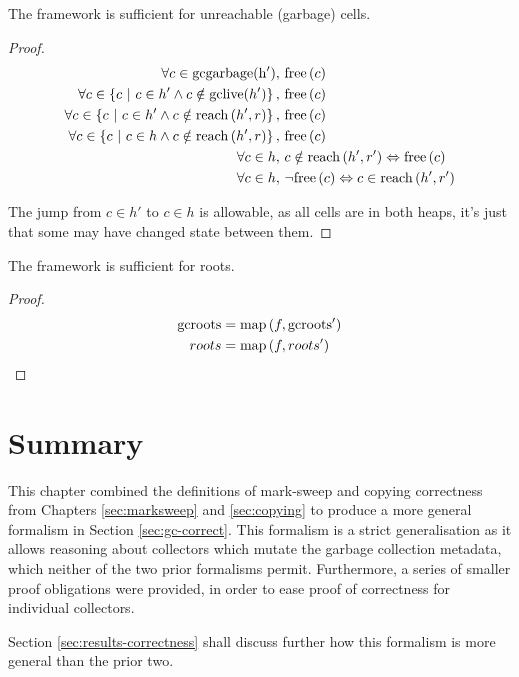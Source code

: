 \begin{lemma}
  The framework is sufficient for unreachable (garbage) cells.
\end{lemma}

\begin{proof}
  \begin{align*}
    \forall c \in \mathrm{gcgarbage(h')},\ & \mathrm{free}\left(c\right)\\
    \forall c \in \left\{c~|~c \in h' \land c \notin
      \mathrm{gclive}(h')\right\},\ & \mathrm{free}\left(c\right)\\
    \forall c \in \left\{c~|~c \in h' \land c \notin
      \mathrm{reach}\left(h', r\right)\right\},\ & \mathrm{free}\left(c\right)\\
    \forall c \in \left\{c~|~c \in h \land c \notin
      \mathrm{reach}\left(h', r\right)\right\},\ & \mathrm{free}\left(c\right)\\
    \forall c \in h,\ & c \notin \mathrm{reach}\left(h', r'\right) \Leftrightarrow \mathrm{free}\left(c\right)\\
    \forall c \in h,\ & \lnot\mathrm{free}\left(c\right) \Leftrightarrow c \in \mathrm{reach}\left(h', r'\right)
  \end{align*}

  The jump from $c \in h'$ to $c \in h$ is allowable, as all cells are
  in both heaps, it's just that some may have changed state between
  them.
\end{proof}

\begin{lemma}[Roots]
  The framework is sufficient for roots.
\end{lemma}

\begin{proof}
  \begin{align*}
    \mathrm{gcroots} &= \mathrm{map}\left(f, \mathrm{gcroots'}\right)\\
    roots &= \mathrm{map}\left(f, roots'\right)
  \end{align*}
\end{proof}

\section{Summary}
\label{sec:gc-summary}

This chapter combined the definitions of mark-sweep and copying
correctness from Chapters \ref{sec:marksweep} and \ref{sec:copying} to
produce a more general formalism in Section \ref{sec:gc-correct}. This
formalism is a strict generalisation as it allows reasoning about
collectors which mutate the garbage collection metadata, which neither
of the two prior formalisms permit. Furthermore, a series of smaller
proof obligations were provided, in order to ease proof of correctness
for individual collectors.

Section \ref{sec:results-correctness} shall discuss further how this
formalism is more general than the prior two.

